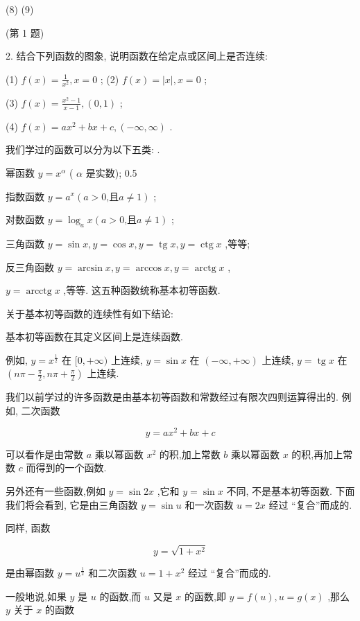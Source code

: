 \documentclass[10pt]{article}
\begin{document}
(8) (9)

(第 1 题)

2. 结合下列函数的图象, 说明函数在给定点或区间上是否连续:

(1) \(f\left( x\right) = \frac{1}{{x}^{2}},x = 0\) ; (2) \(f\left( x\right) = \left| x\right| ,x = 0\) ;

(3) \(f\left( x\right) = \frac{{x}^{2} - 1}{x - 1},\left( {0,1}\right)\) ;

(4) \(f\left( x\right) = a{x}^{2} + {bx} + c,\left( {-\infty ,\infty }\right)\) .

我们学过的函数可以分为以下五类: .

幂函数 \(y = {x}^{\alpha }\) ( \(\alpha\) 是实数); 0.5

指数函数 \(y = {a}^{x}\left( {a > 0\text{,且}a \neq 1}\right)\) ;

对数函数 \(y = {\log }_{a}x\left( {a > 0\text{,且}a \neq 1}\right)\) ;

三角函数 \(y = \sin x,y = \cos x,y = \operatorname{tg}x,y = \operatorname{ctg}x\) ,等等;

反三角函数 \(y = \arcsin x,y = \arccos x,y = \operatorname{arctg}x\) ,

\(y = \operatorname{arcctg}x\) ,等等. 这五种函数统称基本初等函数.

关于基本初等函数的连续性有如下结论:

基本初等函数在其定义区间上是连续函数.

例如, \(y = {x}^{\frac{1}{2}}\) 在 \(\lbrack 0, + \infty )\) 上连续, \(y = \sin x\) 在 \(\left( {-\infty , + \infty }\right)\) 上连续, \(y = \operatorname{tg}x\) 在 \(\left( {{n\pi } - \frac{\pi }{2},{n\pi } + \frac{\pi }{2}}\right)\) 上连续.

我们以前学过的许多函数是由基本初等函数和常数经过有限次四则运算得出的. 例如, 二次函数

\[
y = a{x}^{2} + {bx} + c
\]

可以看作是由常数 \(a\) 乘以幂函数 \({x}^{2}\) 的积,加上常数 \(b\) 乘以幂函数 \(x\) 的积,再加上常数 \(c\) 而得到的一个函数.

另外还有一些函数,例如 \(y = \sin {2x}\) ,它和 \(y = \sin x\) 不同, 不是基本初等函数. 下面我们将会看到, 它是由三角函数 \(y = \sin u\) 和一次函数 \(u = {2x}\) 经过 “复合”而成的.

同样, 函数

\[
y = \sqrt{1 + {x}^{2}}
\]

是由幂函数 \(y = {u}^{\frac{1}{2}}\) 和二次函数 \(u = 1 + {x}^{2}\) 经过 “复合”而成的.

一般地说,如果 \(y\) 是 \(u\) 的函数,而 \(u\) 又是 \(x\) 的函数,即 \(y = f\left( u\right) ,u = g\left( x\right)\) ,那么 \(y\) 关于 \(x\) 的函数
\end{document}

